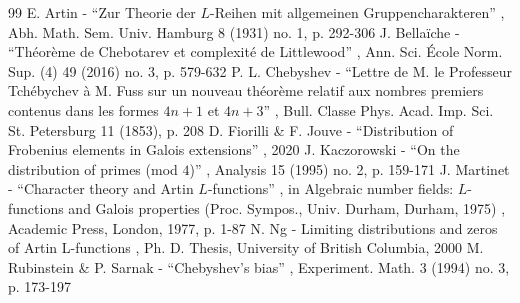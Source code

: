 \begin{thebibliography}{99}
 E. Artin - “Zur Theorie der $L$-Reihen mit allgemeinen Gruppencharakteren” , Abh. Math. Sem. Univ. Hamburg 8 (1931) no. 1, p. 292-306
 J. Bellaïche - “Théorème de Chebotarev et complexité de Littlewood” , Ann. Sci. École Norm. Sup. (4) 49 (2016) no. 3, p. 579-632
 P. L. Chebyshev - “Lettre de M. le Professeur Tchébychev à M. Fuss sur un nouveau théorème relatif aux nombres premiers contenus dans les formes $4n + 1$ et $4n + 3$” , Bull. Classe Phys. Acad. Imp. Sci. St. Petersburg 11 (1853), p. 208
 D. Fiorilli \& F. Jouve - “Distribution of Frobenius elements in Galois extensions” , 2020
 J. Kaczorowski - “On the distribution of primes (mod $4$)” , Analysis 15 (1995) no. 2, p. 159-171
 J. Martinet - “Character theory and Artin $L$-functions” , in Algebraic number fields: $L$-functions and Galois properties (Proc. Sympos., Univ. Durham, Durham, 1975) , Academic Press, London, 1977, p. 1-87
 N. Ng - Limiting distributions and zeros of Artin L-functions , Ph. D. Thesis, University of British Columbia, 2000
 M. Rubinstein \& P. Sarnak - “Chebyshev’s bias” , Experiment. Math. 3 (1994) no. 3, p. 173-197
\end{thebibliography}
